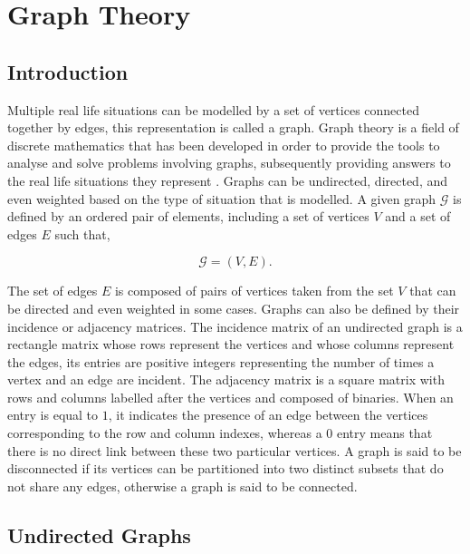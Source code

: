 \chapter{Graph Theory}
\label{AppendixB}

\section{Introduction}

Multiple real life situations can be modelled by a set of vertices connected together by edges, this representation is called a graph. Graph theory is a field of discrete mathematics that has been developed in order to provide the tools to analyse and solve problems involving graphs, subsequently providing answers to the real life situations they represent \citep{Diestel2000,Bondy2008}. Graphs can be undirected, directed, and even weighted based on the type of situation that is modelled. A given graph $\mathcal{G}$ is defined by an ordered pair of elements, including a set of vertices $V$ and a set of edges $E$ such that, 

\begin{equation} \label{eqnB.1}
\mathcal{G} = (V,E).
\end{equation}

The set of edges $E$ is composed of pairs of vertices taken from the set $V$ that can be directed and even weighted in some cases. Graphs can also be defined by their incidence or adjacency matrices. The incidence matrix of an undirected graph is a rectangle matrix whose rows represent the vertices and whose columns represent the edges, its entries are positive integers representing the number of times a vertex and an edge are incident. The adjacency matrix is a square matrix with rows and columns labelled after the vertices and composed of binaries. When an entry is equal to $1$, it indicates the presence of an edge between the vertices corresponding to the row and column indexes, whereas a $0$ entry  means that there is no direct link between these two particular vertices. A graph is said to be disconnected if its vertices can be partitioned into two distinct subsets that do not share any edges, otherwise a graph is said to be connected.

\section{Undirected Graphs}

